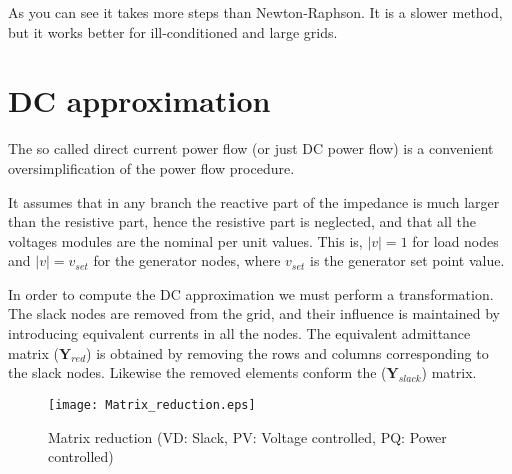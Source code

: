 \documentclass[11pt,fleqn]{book} %
\begin{document}
As you can see it takes more steps than Newton-Raphson. It is a slower method, but it works better for ill-conditioned and large grids.


\newpage
\section{DC approximation}

The so called direct current power flow (or just DC power flow) is a convenient oversimplification of the power flow procedure.

It assumes that in any branch the reactive part of the impedance is much larger than the resistive part, hence the resistive part is neglected, and that all the voltages modules are the nominal per unit values. This is, $|v|=1$ for load nodes and $|v|=v_{set}$ for the generator nodes, where $v_{set}$ is the generator set point value.

In order to compute the DC approximation we must perform a transformation. The slack nodes are removed from the grid, and their influence is maintained by introducing equivalent currents in all the nodes. The equivalent admittance matrix ($\textbf{Y}_{red}$) is obtained by removing the rows and columns corresponding to the slack nodes. Likewise the removed elements conform the ($\textbf{Y}_{slack}$) matrix.

\begin{figure}[h!]
	\centering
	\texttt{[image: Matrix\_reduction.eps]}
	\caption{Matrix reduction (VD: Slack, PV: Voltage controlled, PQ: Power controlled)}
	\label{fig:Matrix_reduction}
\end{figure}

%
%
%
%
%
%
%
%
%
\end{document}

